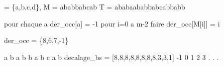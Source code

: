 \sigma = \{a,b,c,d\}, 
M = ababbabcab
T = ababaababbabcabbabb

pour chaque a \in \sigma
	der_occ[a] = -1
pour i=0 a m-2 faire
	der_occ[M[i]] = i

der_occ = \{8,6,7,-1\}	

                 a b a b b a b c a b
decalage_bs = [8,8,8,8,8,8,8,8,3,3,1]
              -1 0 1 2 3 . . .